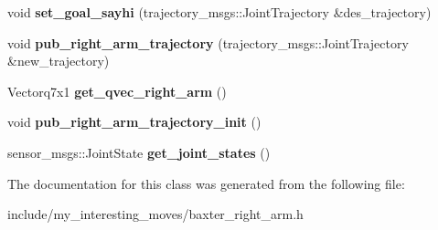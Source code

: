 \begin{DoxyCompactItemize}
\item 
\hypertarget{class_baxter__right__arm_a55d472536b271325987a828d1c539274}{void {\bfseries set\-\_\-goal\-\_\-sayhi} (trajectory\-\_\-msgs\-::\-Joint\-Trajectory \&des\-\_\-trajectory)}\label{class_baxter__right__arm_a55d472536b271325987a828d1c539274}

\item 
\hypertarget{class_baxter__right__arm_a3e09d10ca97d21397b8ca13c8af0a9f3}{void {\bfseries pub\-\_\-right\-\_\-arm\-\_\-trajectory} (trajectory\-\_\-msgs\-::\-Joint\-Trajectory \&new\-\_\-trajectory)}\label{class_baxter__right__arm_a3e09d10ca97d21397b8ca13c8af0a9f3}

\item 
\hypertarget{class_baxter__right__arm_a1184ba6d04eb732c2636b9833dda19bc}{Vectorq7x1 {\bfseries get\-\_\-qvec\-\_\-right\-\_\-arm} ()}\label{class_baxter__right__arm_a1184ba6d04eb732c2636b9833dda19bc}

\item 
\hypertarget{class_baxter__right__arm_a962be58afc54d840d38b3c738e31c5fa}{void {\bfseries pub\-\_\-right\-\_\-arm\-\_\-trajectory\-\_\-init} ()}\label{class_baxter__right__arm_a962be58afc54d840d38b3c738e31c5fa}

\item 
\hypertarget{class_baxter__right__arm_a8863c7ba5453ab04998de2e9800029f0}{sensor\-\_\-msgs\-::\-Joint\-State {\bfseries get\-\_\-joint\-\_\-states} ()}\label{class_baxter__right__arm_a8863c7ba5453ab04998de2e9800029f0}

\end{DoxyCompactItemize}


The documentation for this class was generated from the following file\-:\begin{DoxyCompactItemize}
\item 
include/my\-\_\-interesting\-\_\-moves/baxter\-\_\-right\-\_\-arm.\-h\end{DoxyCompactItemize}
